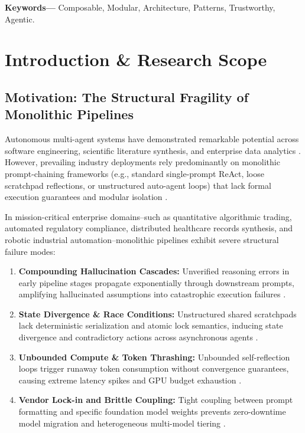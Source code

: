 \documentclass[10pt,twocolumn,letterpaper]{article}
\begin{document}
\noindent\textbf{Keywords---} Composable, Modular, Architecture, Patterns, Trustworthy, Agentic.







\section{Introduction \& Research Scope}



\subsection{Motivation: The Structural Fragility of Monolithic Pipelines}


Autonomous multi-agent systems have demonstrated remarkable potential across software engineering, scientific literature synthesis, and enterprise data analytics \cite{arxiv_2005_14165,arxiv_2203_02155}. However, prevailing industry deployments rely predominantly on monolithic prompt-chaining frameworks (e.g., standard single-prompt ReAct, loose scratchpad reflections, or unstructured auto-agent loops) that lack formal execution guarantees and modular isolation \cite{arxiv_2312_03893}.

In mission-critical enterprise domains--such as quantitative algorithmic trading, automated regulatory compliance, distributed healthcare records synthesis, and robotic industrial automation--monolithic pipelines exhibit severe structural failure modes:
\begin{enumerate}
  \item \textbf{Compounding Hallucination Cascades:} Unverified reasoning errors in early pipeline stages propagate exponentially through downstream prompts, amplifying hallucinated assumptions into catastrophic execution failures \cite{arxiv_2406_00584}.
  \item \textbf{State Divergence \& Race Conditions:} Unstructured shared scratchpads lack deterministic serialization and atomic lock semantics, inducing state divergence and contradictory actions across asynchronous agents \cite{arxiv_2501_02497}.
  \item \textbf{Unbounded Compute \& Token Thrashing:} Unbounded self-reflection loops trigger runaway token consumption without convergence guarantees, causing extreme latency spikes and GPU budget exhaustion \cite{arxiv_2405_01543,arxiv_2406_04028}.
  \item \textbf{Vendor Lock-in and Brittle Coupling:} Tight coupling between prompt formatting and specific foundation model weights prevents zero-downtime model migration and heterogeneous multi-model tiering \cite{arxiv_2305_18290,arxiv_2208_14227}.
\end{enumerate}
\end{document}
